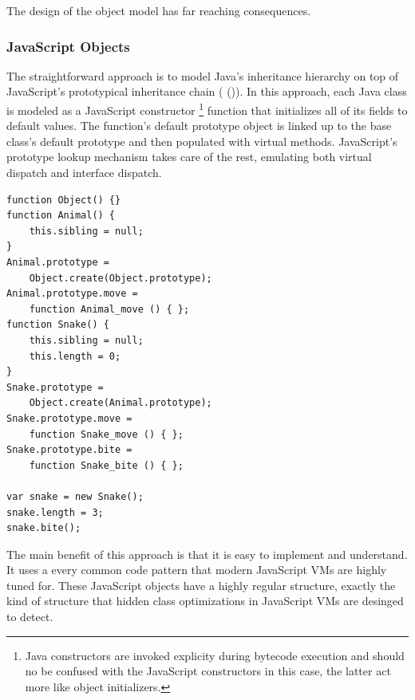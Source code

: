 \documentclass{acm_proc_article-sp}
\begin{document}
The design of the object model has far reaching consequences.

\subsubsection{JavaScript Objects}
The straightforward approach is to model Java's inheritance hierarchy on top of JavaScript's prototypical inheritance chain ( ()).
In this approach, each Java class is modeled as a JavaScript constructor \footnote{Java constructors are invoked explicity during bytecode execution and should no be confused with the JavaScript constructors in this case, the latter act more like object initializers.} function that initializes all of its fields to default values.
The function's default prototype object is linked up to the base class's default prototype and then populated with virtual methods.
JavaScript's prototype lookup mechanism takes care of the rest, emulating both virtual dispatch and interface dispatch.

\begin{lstlisting}[caption=Simple Object Model]
function Object() {}
function Animal() {
	this.sibling = null;
}
Animal.prototype = 
	Object.create(Object.prototype); 
Animal.prototype.move = 
	function Animal_move () { };
function Snake() {
	this.sibling = null;
	this.length = 0;
}
Snake.prototype = 
	Object.create(Animal.prototype);
Snake.prototype.move = 
	function Snake_move () { };
Snake.prototype.bite = 
	function Snake_bite () { };

var snake = new Snake();
snake.length = 3;
snake.bite();
\end{lstlisting}

The main benefit of this approach is that it is easy to implement and understand.
It uses a every common code pattern that modern JavaScript VMs are highly tuned for.
These JavaScript objects have a highly regular structure, exactly the kind of structure that hidden class optimizations in JavaScript VMs are desinged to detect.
\end{document}
